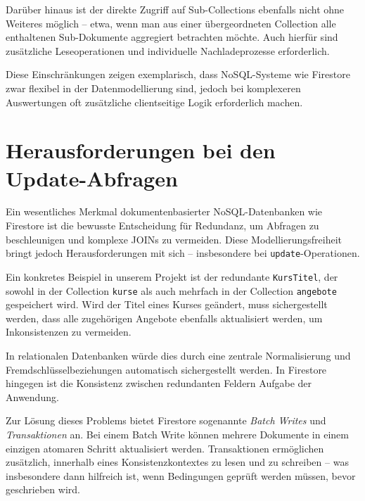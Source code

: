 \documentclass[12pt,a4paper%
              ,oneside     %
              ,titlepage
              ,DIV=13
              ,headinclude
              ,footinclude=false%
              ,cleardoublepage=empty%
              ,parskip=half,
              BCOR=0mm,
              ]{scrreprt}
\begin{document}
Darüber hinaus ist der direkte Zugriff auf Sub-Collections ebenfalls nicht ohne Weiteres möglich – etwa, wenn man aus einer übergeordneten Collection alle enthaltenen Sub-Dokumente aggregiert betrachten möchte. Auch hierfür sind zusätzliche Leseoperationen und individuelle Nachladeprozesse erforderlich.

Diese Einschränkungen zeigen exemplarisch, dass NoSQL-Systeme wie Firestore zwar flexibel in der Datenmodellierung sind, jedoch bei komplexeren Auswertungen oft zusätzliche clientseitige Logik erforderlich machen.

\chapter{Herausforderungen bei den Update-Abfragen}
\label{update-label}

Ein wesentliches Merkmal dokumentenbasierter NoSQL-Datenbanken wie Firestore ist die bewusste Entscheidung für Redundanz, um Abfragen zu beschleunigen und komplexe JOINs zu vermeiden. Diese Modellierungsfreiheit bringt jedoch Herausforderungen mit sich – insbesondere bei \texttt{update}-Operationen.

Ein konkretes Beispiel in unserem Projekt ist der redundante \texttt{KursTitel}, der sowohl in der Collection \texttt{kurse} als auch mehrfach in der Collection \texttt{angebote} gespeichert wird. Wird der Titel eines Kurses geändert, muss sichergestellt werden, dass alle zugehörigen Angebote ebenfalls aktualisiert werden, um Inkonsistenzen zu vermeiden.

In relationalen Datenbanken würde dies durch eine zentrale Normalisierung und Fremdschlüsselbeziehungen automatisch sichergestellt werden. In Firestore hingegen ist die Konsistenz zwischen redundanten Feldern Aufgabe der Anwendung.

Zur Lösung dieses Problems bietet Firestore sogenannte \textit{Batch Writes} und \textit{Transaktionen} an. Bei einem Batch Write können mehrere Dokumente in einem einzigen atomaren Schritt aktualisiert werden. Transaktionen ermöglichen zusätzlich, innerhalb eines Konsistenzkontextes zu lesen und zu schreiben – was insbesondere dann hilfreich ist, wenn Bedingungen geprüft werden müssen, bevor geschrieben wird.
\end{document}
